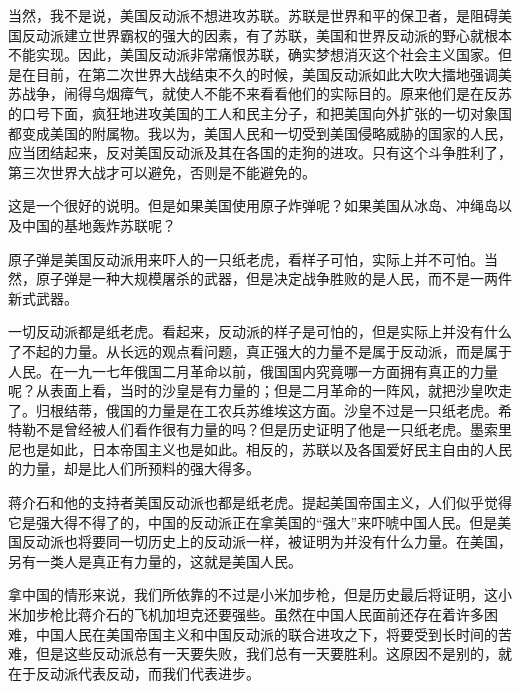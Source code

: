 当然，我不是说，美国反动派不想进攻苏联。苏联是世界和平的保卫者，是阻碍美国反动派建立世界霸权的强大的因素，有了苏联，美国和世界反动派的野心就根本不能实现。因此，美国反动派非常痛恨苏联，确实梦想消灭这个社会主义国家。但是在目前，在第二次世界大战结束不久的时候，美国反动派如此大吹大擂地强调美苏战争，闹得乌烟瘴气，就使人不能不来看看他们的实际目的。原来他们是在反苏的口号下面，疯狂地进攻美国的工人和民主分子，和把美国向外扩张的一切对象国都变成美国的附属物。我以为，美国人民和一切受到美国侵略威胁的国家的人民，应当团结起来，反对美国反动派及其在各国的走狗的进攻。只有这个斗争胜利了，第三次世界大战才可以避免，否则是不能避免的。

这是一个很好的说明。但是如果美国使用原子炸弹呢？如果美国从冰岛、冲绳岛以及中国的基地轰炸苏联呢？

原子弹是美国反动派用来吓人的一只纸老虎，看样子可怕，实际上并不可怕。当然，原子弹是一种大规模屠杀的武器，但是决定战争胜败的是人民，而不是一两件新式武器。

一切反动派都是纸老虎。看起来，反动派的样子是可怕的，但是实际上并没有什么了不起的力量。从长远的观点看问题，真正强大的力量不是属于反动派，而是属于人民。在一九一七年俄国二月革命以前，俄国国内究竟哪一方面拥有真正的力量呢？从表面上看，当时的沙皇是有力量的；但是二月革命的一阵风，就把沙皇吹走了。归根结蒂，俄国的力量是在工农兵苏维埃这方面。沙皇不过是一只纸老虎。希特勒不是曾经被人们看作很有力量的吗？但是历史证明了他是一只纸老虎。墨索里尼也是如此，日本帝国主义也是如此。相反的，苏联以及各国爱好民主自由的人民的力量，却是比人们所预料的强大得多。

蒋介石和他的支持者美国反动派也都是纸老虎。提起美国帝国主义，人们似乎觉得它是强大得不得了的，中国的反动派正在拿美国的“强大”来吓唬中国人民。但是美国反动派也将要同一切历史上的反动派一样，被证明为并没有什么力量。在美国，另有一类人是真正有力量的，这就是美国人民。

拿中国的情形来说，我们所依靠的不过是小米加步枪，但是历史最后将证明，这小米加步枪比蒋介石的飞机加坦克还要强些。虽然在中国人民面前还存在着许多困难，中国人民在美国帝国主义和中国反动派的联合进攻之下，将要受到长时间的苦难，但是这些反动派总有一天要失败，我们总有一天要胜利。这原因不是别的，就在于反动派代表反动，而我们代表进步。


